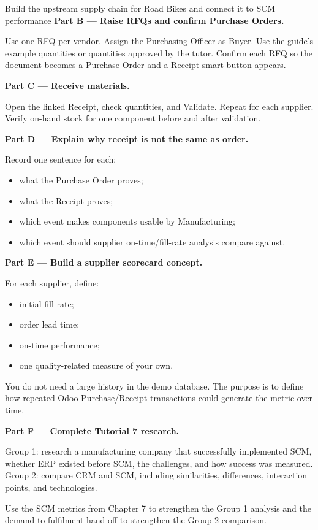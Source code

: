 \begin{labproject}{Build the upstream supply chain for Road Bikes and connect it to SCM performance}
\medskip\noindent\textbf{Part B --- Raise RFQs and confirm Purchase Orders.}

Use one RFQ per vendor. Assign the Purchasing Officer as Buyer. Use the guide's example quantities or quantities approved by the tutor. Confirm each RFQ so the document becomes a Purchase Order and a Receipt smart button appears.

\medskip\noindent\textbf{Part C --- Receive materials.}

Open the linked Receipt, check quantities, and Validate. Repeat for each supplier. Verify on-hand stock for one component before and after validation.

\medskip\noindent\textbf{Part D --- Explain why receipt is not the same as order.}

Record one sentence for each:
\begin{itemize}
  \item what the Purchase Order proves;
  \item what the Receipt proves;
  \item which event makes components usable by Manufacturing;
  \item which event should supplier on-time/fill-rate analysis compare against.
\end{itemize}

\medskip\noindent\textbf{Part E --- Build a supplier scorecard concept.}

For each supplier, define:
\begin{itemize}
  \item initial fill rate;
  \item order lead time;
  \item on-time performance;
  \item one quality-related measure of your own.
\end{itemize}

You do not need a large history in the demo database. The purpose is to define how repeated Odoo Purchase/Receipt transactions could generate the metric over time.

\medskip\noindent\textbf{Part F --- Complete Tutorial 7 research.}

Group 1: research a manufacturing company that successfully implemented SCM, whether ERP existed before SCM, the challenges, and how success was measured.\\
Group 2: compare CRM and SCM, including similarities, differences, interaction points, and technologies.

Use the SCM metrics from Chapter 7 to strengthen the Group 1 analysis and the demand-to-fulfilment hand-off to strengthen the Group 2 comparison.
\end{labproject}

